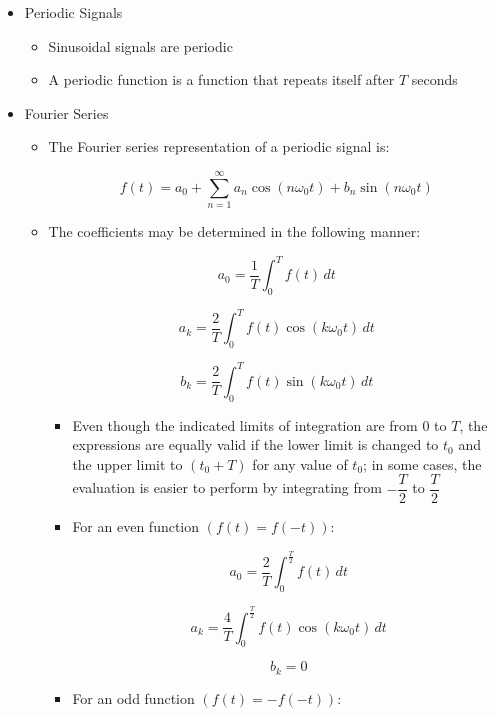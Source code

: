 \begin{itemize}

  \item Periodic Signals

    \begin{itemize}

      \item Sinusoidal signals are periodic

      \item A periodic function is a function that repeats itself after $T$ seconds

    \end{itemize}

  \item Fourier Series

    \begin{itemize}

      \item The Fourier series representation of a periodic signal is:

        $$\boxed{f(t)=a_0+\sum_{n=1}^{\infty} a_n\cos(n\omega_0t)+b_n\sin(n\omega_0t)}$$

      \item The coefficients may be determined in the following manner:

        $$a_0=\frac{1}{T}\int_0^T f(t)\,dt$$

        $$a_k=\frac{2}{T}\int_0^T f(t)\cos(k\omega_0t)\,dt$$

        $$b_k=\frac{2}{T}\int_0^T f(t)\sin(k\omega_0t)\,dt$$

        \begin{itemize}

          \item Even though the indicated limits of integration are from 0 to $T$, the expressions are equally valid if the lower limit is changed to $t_0$ and the upper limit to $(t_0+T)$ for any value of $t_0$; in some cases, the evaluation is easier to perform by integrating from $-\dfrac{T}{2}$ to $\dfrac{T}{2}$

          \item For an even function $(f(t)=f(-t))$:

            $$a_0=\frac{2}{T}\int_0^{\frac{T}{2}}f(t)\,dt$$

            $$a_k=\frac{4}{T}\int_0^{\frac{T}{2}}f(t)\cos(k\omega_0t)\,dt$$

            $$b_k=0$$

          \item For an odd function $(f(t)=-f(-t))$:


\end{itemize}
\end{itemize}
\end{itemize}
